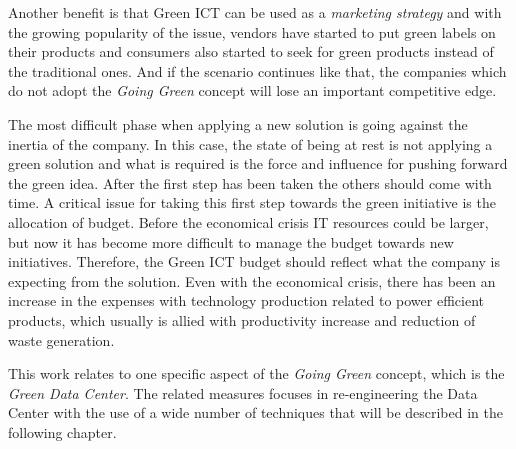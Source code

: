     Another benefit is that Green ICT can be used as a \emph{marketing strategy} and with the growing popularity of the issue, vendors have started to put green labels on their products and consumers also started to seek for green products instead of the traditional ones. And if the scenario continues like that, the companies which do not adopt the \emph{Going Green} concept will lose an important competitive edge.
    
    The most difficult phase when applying a new solution is going against the inertia of the company. In this case, the state of being at rest is not applying a green solution and what is required is the force and influence for pushing forward the green idea. After the first step has been taken the others should come with time. A critical issue for taking this first step towards the green initiative is the allocation of budget. Before the economical crisis IT resources could be larger, but now it has become more difficult to manage the budget towards new initiatives. Therefore, the Green ICT budget should reflect what the company is expecting from the solution. Even with the economical crisis, there has been an increase in the expenses with technology production related to power efficient products, which usually is allied with productivity increase and reduction of waste generation. 
    
        This work relates to one specific aspect of the \emph{Going Green} concept, which is the \emph{Green Data Center}. The related measures focuses in re-engineering the Data Center with the use of a wide number of techniques that will be described in the following chapter.




